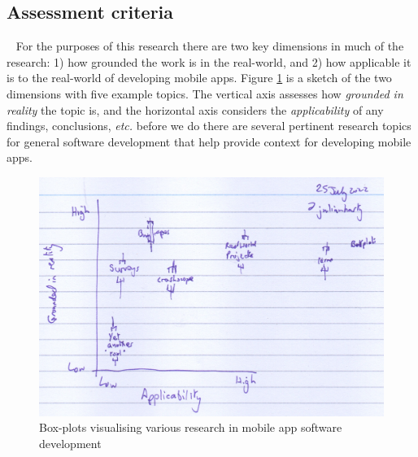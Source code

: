 \subsection{Assessment criteria}~\label{rw-assessment-criteria-topic}
For the purposes of this research there are two key dimensions in much of the research: 1) how grounded the work is in the real-world, and 2) how applicable it is to the real-world of developing mobile apps. Figure \ref{fig:grounded-and-applicable-boxplots} is a sketch of the two dimensions with five example topics. The vertical axis assesses how \emph{grounded in reality} the topic is, and the horizontal axis considers the \emph{applicability} of any findings, conclusions, \emph{etc.} %
before we do there are several pertinent research topics for general software development that help provide context for developing mobile apps.

\begin{figure}
    \centering
    \includegraphics[width=\linewidth]{images/rough-sketches/grounded-and-applicable.jpeg}
    \caption{Box-plots visualising various research in mobile app software development}
    \label{fig:grounded-and-applicable-boxplots}
\end{figure}

